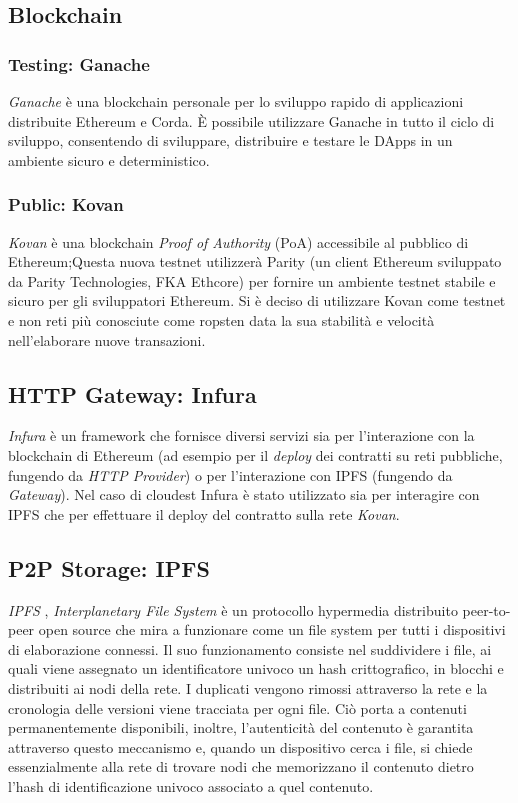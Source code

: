 \documentclass{article}
\begin{document}
\subsection{Blockchain}
\subsubsection{Testing: Ganache}
\textit{Ganache} \cite{ganache} è una blockchain personale per lo sviluppo rapido di applicazioni distribuite Ethereum e Corda. È possibile utilizzare Ganache in tutto il ciclo di sviluppo, consentendo di sviluppare, distribuire e testare le DApps in un ambiente sicuro e deterministico.
\subsubsection{Public: Kovan}
\textit{Kovan} \cite{kovan} è una blockchain \textit{Proof of Authority} (PoA) accessibile al pubblico di Ethereum;Questa nuova testnet utilizzerà Parity (un client Ethereum sviluppato da Parity Technologies, FKA Ethcore) per fornire un ambiente testnet stabile e sicuro per gli sviluppatori Ethereum. Si è deciso di utilizzare Kovan come testnet e non reti più conosciute come ropsten data la sua stabilità e velocità nell'elaborare nuove transazioni.

\subsection{HTTP Gateway: Infura}
\textit{Infura} \cite{infura} è un framework che fornisce diversi servizi sia per l'interazione con la blockchain di Ethereum (ad esempio per il \textit{deploy} dei contratti su reti pubbliche, fungendo da \textit{HTTP Provider}) o per l'interazione con IPFS (fungendo da \textit{Gateway}). Nel caso di cloudest Infura è stato utilizzato sia per interagire con IPFS che per effettuare il deploy del contratto sulla rete \textit{Kovan}.

\subsection{P2P Storage: IPFS}
\textit{IPFS} \cite{ipfs}, \textit{Interplanetary File System} è un protocollo hypermedia distribuito peer-to-peer open source che mira a funzionare come un file system per tutti i dispositivi di elaborazione connessi. Il suo funzionamento consiste nel suddividere i file, ai quali viene assegnato un identificatore univoco un hash crittografico, in blocchi e distribuiti ai nodi della rete. I duplicati vengono rimossi attraverso la rete e la cronologia delle versioni viene tracciata per ogni file. Ciò porta a contenuti permanentemente disponibili, inoltre, l’autenticità del contenuto è garantita attraverso questo meccanismo e, quando un dispositivo cerca i file, si chiede essenzialmente alla rete di trovare nodi che memorizzano il contenuto dietro l’hash di identificazione univoco associato a quel contenuto.
\end{document}
